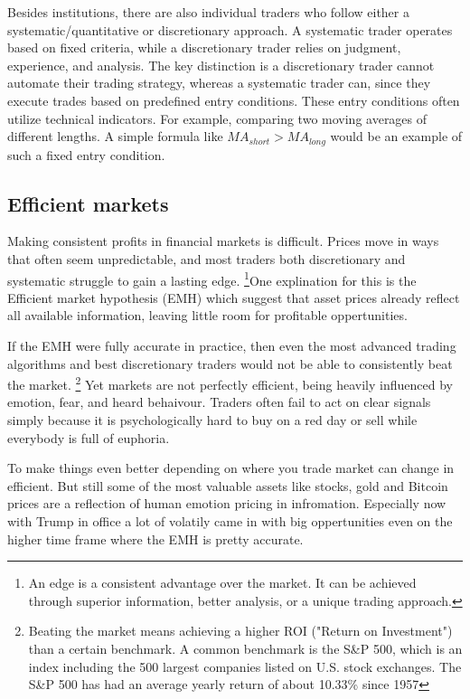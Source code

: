 \documentclass[12pt]{article}
\begin{document}
Besides institutions, there are also individual traders who follow either a systematic/quantitative or discretionary approach. A systematic trader operates based on fixed criteria, while a discretionary trader relies on judgment, experience, and analysis. The key distinction is a discretionary trader cannot automate their trading strategy, whereas a systematic trader can, since they execute trades based on predefined entry conditions. These entry conditions often utilize technical indicators. For example, comparing two moving averages of different lengths. A simple formula like $MA_{short} > MA_{long}$ would be an example of such a fixed entry condition.

\newpage
\subsection{Efficient markets}
Making consistent profits in financial markets is difficult. Prices move in ways that often seem unpredictable, and most traders both discretionary and systematic struggle to gain a lasting edge. \footnote[1]{An edge is a consistent advantage over the market. It can be achieved through superior information, better analysis, or a unique trading approach.}One explination for this is the Efficient market hypothesis (EMH) which suggest that asset prices already reflect all available information, leaving little room for profitable oppertunities.


If the EMH were fully accurate in practice, then even the most advanced trading algorithms and best discretionary traders would not be able to consistently beat the market. \footnote[2]{Beating the market means achieving a higher ROI ("Return on Investment") than a certain benchmark. A common benchmark is the S\&P 500, which is an index including the 500 largest companies listed on U.S. stock exchanges. The S\&P 500 has had an average yearly return of about 10.33\% since 1957} Yet markets are not perfectly efficient, being heavily influenced by emotion, fear, and heard behaivour. Traders often fail to act on clear signals simply because it is psychologically hard to buy on a red day or sell while everybody is full of euphoria. 


To make things even better depending on where you trade market can change in efficient. But still some of the most valuable assets like stocks, gold and Bitcoin prices are a reflection of human emotion pricing in infromation. Especially now with Trump in office a lot of volatily came in with big oppertunities even on the higher time frame where the EMH is pretty accurate.  
\end{document}
